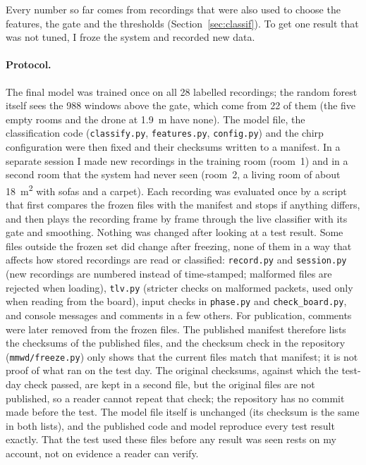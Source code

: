 \documentclass[11pt,a4paper]{article}
\begin{document}
Every number so far comes from recordings that were also used to choose the features, the gate and the thresholds (Section~\ref{sec:classif}). To get one result that was not tuned, I froze the system and recorded new data.

\paragraph{Protocol.} The final model was trained once on all 28 labelled recordings; the random forest itself sees the 988 windows above the gate, which come from 22 of them (the five empty rooms and the drone at \SI{1.9}{m} have none). The model file, the classification code (\texttt{classify.py}, \texttt{features.py}, \texttt{config.py}) and the chirp configuration were then fixed and their checksums written to a manifest. In a separate session I made new recordings in the training room (room~1) and in a second room that the system had never seen (room~2, a living room of about \SI{18}{m^2} with sofas and a carpet). Each recording was evaluated once by a script that first compares the frozen files with the manifest and stops if anything differs, and then plays the recording frame by frame through the live classifier with its gate and smoothing. Nothing was changed after looking at a test result. Some files outside the frozen set did change after freezing, none of them in a way that affects how stored recordings are read or classified: \texttt{record.py} and \texttt{session.py} (new recordings are numbered instead of time-stamped; malformed files are rejected when loading), \texttt{tlv.py} (stricter checks on malformed packets, used only when reading from the board), input checks in \texttt{phase.py} and \texttt{check\_board.py}, and console messages and comments in a few others. For publication, comments were later removed from the frozen files. The published manifest therefore lists the checksums of the published files, and the checksum check in the repository (\texttt{mmwd/freeze.py}) only shows that the current files match that manifest; it is not proof of what ran on the test day. The original checksums, against which the test-day check passed, are kept in a second file, but the original files are not published, so a reader cannot repeat that check; the repository has no commit made before the test. The model file itself is unchanged (its checksum is the same in both lists), and the published code and model reproduce every test result exactly. That the test used these files before any result was seen rests on my account, not on evidence a reader can verify.
\end{document}
